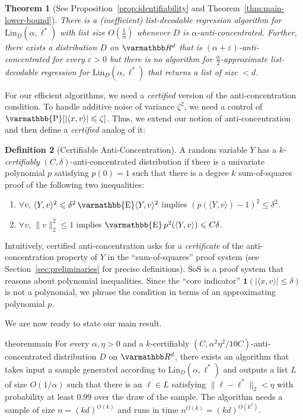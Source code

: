\documentclass{article}
\newtheorem{theorem}{Theorem}[section]
\theoremstyle{definition}
\newtheorem{definition}[theorem]{Definition}
\theoremstyle{remark}
\let\mathbb\varmathbb
\newcommand{\Pnote}[1]{}
\newcommand{\paren}[1]{(#1)}
\newcommand{\iprod}[1]{\langle#1\rangle}
\newcommand{\Esymb}{\mathbb{E}}
\newcommand{\Psymb}{\mathbb{P}}
\DeclareMathOperator*{\E}{\Esymb}
\DeclareMathOperator*{\ProbOp}{\Psymb}
\renewcommand{\Pr}{\ProbOp}
\newcommand{\R}{\mathbb R}
\renewcommand{\leq}{\leqslant}
\let\epsilon=\varepsilon
\numberwithin{equation}{section}
\newcommand{\1}{\bm{1}}
\newcommand{\Lin}{\mathrm{Lin}}
\begin{document}
\begin{theorem}[See Proposition~\ref{prop:identifiability} and Theorem~\ref{thm:main-lower-bound}]
	There is a (inefficient) list-decodable regression algorithm for $\Lin_D(\alpha,\ell^*)$ with list size $O(\frac{1}{\alpha})$ whenever $D$ is $\alpha$-anti-concentrated. 
	Further, there exists a distribution $D$ on $\R^d$ that is $\paren{\alpha+\epsilon}$-anti-concentrated for every $\epsilon >0$ but there is no algorithm for $\frac{\alpha}{2}$-approximate list-decodable regression for $\Lin_D(\alpha,\ell^*)$  that returns a list of size $<d$. 
\end{theorem}
For our efficient algorithms, we need a \emph{certified} version of the anti-concentration condition. 
To handle additive noise of variance $\zeta^2$, we need a control of $\Pr[ |\iprod{x,v}| \leq \zeta]$. 
Thus, we extend our notion of anti-concentration and then define a \emph{certified} analog of it:
\begin{definition}[Certifiable Anti-Concentration] \label{def:certified-anti-concentration}
	A random variable $Y$ has a $k$-\emph{certifiably} $(C,\delta)$-anti-concentrated distribution if there is a univariate polynomial $p$ satisfying $p(0) = 1$ such that there is a degree $k$ sum-of-squares proof of the following two inequalities: 
	\begin{enumerate} 
		\item $\forall v$, $\langle Y,v\rangle^2 \leq \delta^2 \E \langle Y,v\rangle^2$ implies $(p(\langle Y,v\rangle) -1)^2\leq \delta^2$.
		\item $\forall v$, $\|v\|_2^2 \leq 1$ implies  $\E p^2(\left \langle Y,v\rangle \right) \leq C\delta$.
	\end{enumerate}
\end{definition} 
Intuitively, certified anti-concentration asks for a \emph{certificate} of the anti-concentration property of $Y$ in the ``sum-of-squares'' proof system (see Section~\ref{sec:preliminaries} for precise definitions). SoS is a proof system that reasons about  polynomial inequalities. Since the ``core indicator'' $\1(|\iprod{x,v}| \leq \delta)$ is not a polynomial, we phrase the condition in terms of an approximating polynomial $p$.
\Pnote{seems like it would be nice to have some explanation for the properties of the polynomial asked for in this definition...}
We are now ready to state our main result.
\begin{restatable}{theorem}{main} \label{thm:main}
	For every $\alpha, \eta > 0$ and a $k$-certifiably $(C,\alpha^2 \eta^2/10C)$-anti-concentrated distribution $D$ on $\R^d$, there exists an algorithm that takes input a sample generated according to $\Lin_D(\alpha,\ell^*)$ and outputs a list $L$ of size $O(1/\alpha)$ such that there is an $\ell \in L$ satisfying $\| \ell - \ell^*\|_2 < \eta$ with probability at least $0.99$ over the draw of the sample. The algorithm needs a sample of size $n = (kd)^{O(k)}$ and runs in time $n^{O(k)} = (kd)^{O(k^2)}$.
\end{restatable} 
\end{document}
